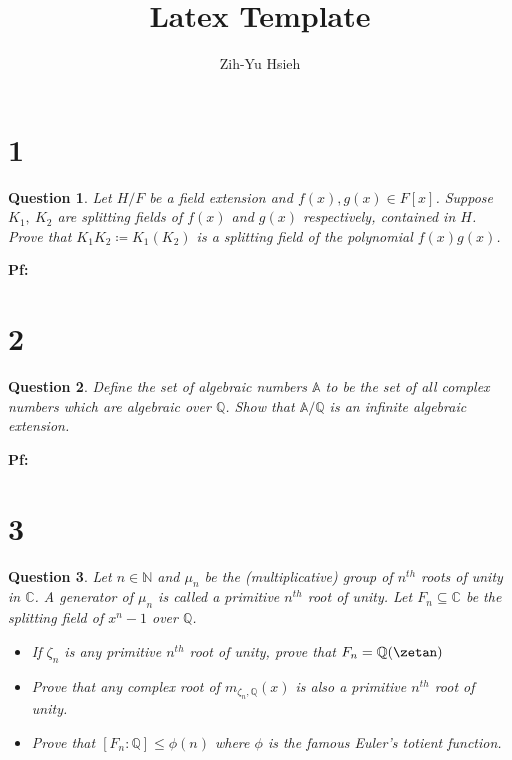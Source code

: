 \documentclass{article}
\title{Latex Template}
\author{Zih-Yu Hsieh}
\newtheorem{question}{Question}
\begin{document}
\maketitle

\section*{1}
\begin{myBox}[]{}
    \begin{question}
        Let $H/F$ be a field extension and $f(x), g(x) \in F[x]$. Suppose $K_1,\ K_2$ are splitting
        fields of $f(x)$ and $g(x)$ respectively, contained in $H$. Prove that $K_1K_2 \coloneqq K_1(K_2)$ is a
        splitting field of the polynomial $f(x)g(x)$.
    \end{question}
\end{myBox}

\textbf{Pf:}

\break

\section*{2}
\begin{myBox}[]{}
    \begin{question}
        Define the set of algebraic numbers $\mathbb{A}$ to be the set of all complex numbers which are
        algebraic over $\mathbb{Q}$. Show that $\mathbb{A}/\mathbb{Q}$ is an infinite algebraic extension.
    \end{question}
\end{myBox}

\textbf{Pf:}

\break

\section*{3}
\begin{myBox}[]{}
    \begin{question}
        Let $n\in\mathbb{N}$ and $\mu_n$ be the (multiplicative) group of $n^{th}$ roots of unity in $\mathbb{C}$. A
        generator of $\mu_n$ is called a primitive $n^{th}$ root of unity. Let $F_n\subseteq\mathbb{C}$ be the splitting
        field of $x^n-1$ over $\mathbb{Q}$.
        \begin{itemize}
            \item[(a)]If $\zeta_n$ is any primitive $n^{th}$ root of unity, prove that $F_n=\mathbb{Q}(\zetan)$
            \item[(b)]Prove that any complex root of $m_{\zeta_n,\mathbb{Q}}(x)$ is also a primitive $n^{th}$ root of unity.
            \item[(c)]Prove that $[F_n:\mathbb{Q}]\leq\phi(n)$ where $\phi$ is the famous Euler's totient function.
        \end{itemize}
    \end{question}
\end{myBox}
\end{document}
